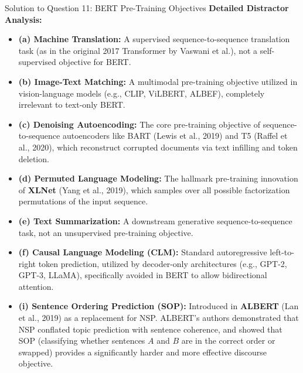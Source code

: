 \documentclass[11pt,a4paper]{article}
\begin{document}
\begin{solutionbox}{Solution to Question 11: BERT Pre-Training Objectives}
\medskip
\textbf{Detailed Distractor Analysis:}
\begin{itemize}[leftmargin=1.8em]
    \item \textbf{(a) Machine Translation:} A supervised sequence-to-sequence translation task (as in the original 2017 Transformer by Vaswani et al.), not a self-supervised objective for BERT.
    \item \textbf{(b) Image-Text Matching:} A multimodal pre-training objective utilized in vision-language models (e.g., CLIP, ViLBERT, ALBEF), completely irrelevant to text-only BERT.
    \item \textbf{(c) Denoising Autoencoding:} The core pre-training objective of sequence-to-sequence autoencoders like BART (Lewis et al., 2019) and T5 (Raffel et al., 2020), which reconstruct corrupted documents via text infilling and token deletion.
    \item \textbf{(d) Permuted Language Modeling:} The hallmark pre-training innovation of \textbf{XLNet} (Yang et al., 2019), which samples over all possible factorization permutations of the input sequence.
    \item \textbf{(e) Text Summarization:} A downstream generative sequence-to-sequence task, not an unsupervised pre-training objective.
    \item \textbf{(f) Causal Language Modeling (CLM):} Standard autoregressive left-to-right token prediction, utilized by decoder-only architectures (e.g., GPT-2, GPT-3, LLaMA), specifically avoided in BERT to allow bidirectional attention.
    \item \textbf{(i) Sentence Ordering Prediction (SOP):} Introduced in \textbf{ALBERT} (Lan et al., 2019) as a replacement for NSP. ALBERT's authors demonstrated that NSP conflated topic prediction with sentence coherence, and showed that SOP (classifying whether sentences $A$ and $B$ are in the correct order or swapped) provides a significantly harder and more effective discourse objective.
\end{itemize}
\end{solutionbox}
\end{document}

